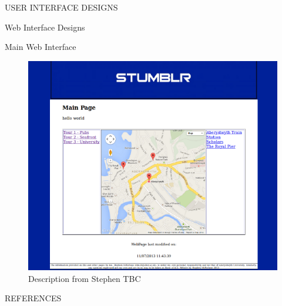 \documentclass{article}
\begin{document}
\begin{section}{USER INTERFACE DESIGNS}
		\clearpage
		\begin{subsection}{Web Interface Designs}
			\begin{subsubsection}{Main Web Interface}
				\begin{figure}[h!]
					\begin{center}
						\includegraphics[height=0.55\columnwidth]{../Diagrams/WebUserInterface/WebUI.png}
					\end{center}
					\caption{Description from Stephen TBC}
				\end{figure}
			\end{subsubsection}
		\end{subsection}
	\end{section}

	\nocite{LaTeXTemplate}

	\newpage
	\begin{section}{REFERENCES}
		
		
	\end{section}
\end{document}
